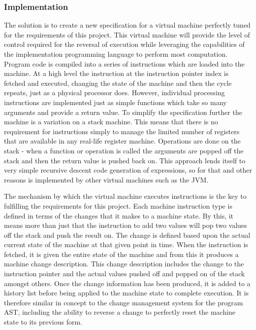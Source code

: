 \subsubsection{Implementation}

The solution is to create a new specification for a virtual machine perfectly tuned for the requirements of this project. This virtual machine will provide the level of control required for the reversal of execution while leveraging the capabilities of the implementation programming language to perform most computation. Program code is compiled into a series of instructions which are loaded into the machine. At a high level the instruction at the instruction pointer index is fetched and executed, changing the state of the machine and then the cycle repeats, just as a physical processor does. However, individual processing instructions are implemented just as simple functions which take so many arguments and provide a return value. To simplify the specification further the machine is a variation on a stack machine. This means that there is no requirement for instructions simply to manage the limited number of registers that are available in any real-life register machine. Operations are done on the stack - when a function or operation is called the arguments are popped off the stack and then the return value is pushed back on. This approach lends itself to very simple recursive descent code generation of expressions, so for that and other reasons is implemented by other virtual machines such as the JVM.

The mechanism by which the virtual machine executes instructions is the key to fulfilling the requirements for this project. Each machine instruction type is defined in terms of the changes that it makes to a machine state. By this, it means more than just that the instruction to add two values will pop two values off the stack and push the result on. The change is defined based upon the actual current state of the machine at that given point in time. When the instruction is fetched, it is given the entire state of the machine and from this it produces a machine change description. This change description includes the change to the instruction pointer and the actual values pushed off and popped on of the stack amongst others. Once the change information has been produced, it is added to a history list before being applied to the machine state to complete execution. It is therefore similar in concept to the change management system for the program AST, including the ability to reverse a change to perfectly reset the machine state to its previous form. 

